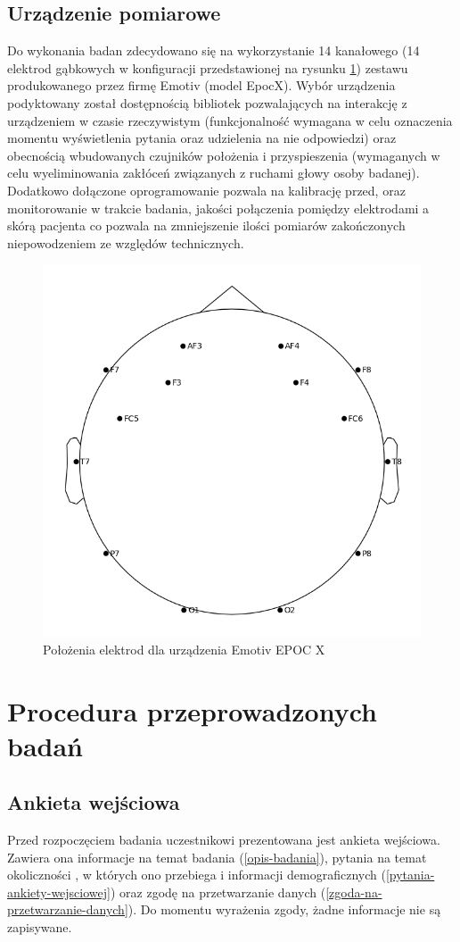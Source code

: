 \documentclass{./assets/wfis}
\begin{document}
\subsection{Urządzenie pomiarowe}\label{emotiv}
Do wykonania badan zdecydowano się na wykorzystanie 14 kanałowego (14 elektrod gąbkowych w konfiguracji przedstawionej na rysunku \ref{fig:emotiv-electrode-locations}) zestawu produkowanego przez firmę Emotiv (model EpocX\cite{emotiv_inc_epoc_nodate}). Wybór urządzenia podyktowany został dostępnością bibliotek pozwalających na interakcję z urządzeniem w czasie rzeczywistym\cite{emotiv_inc_emotiv_nodate-1} (funkcjonalność wymagana w celu oznaczenia momentu wyświetlenia pytania oraz udzielenia na nie odpowiedzi) oraz obecnością wbudowanych czujników położenia i przyspieszenia (wymaganych w celu wyeliminowania zakłóceń związanych z ruchami głowy osoby badanej). Dodatkowo dołączone oprogramowanie pozwala na kalibrację przed, oraz monitorowanie w trakcie badania, jakości połączenia pomiędzy elektrodami a skórą pacjenta co pozwala na zmniejszenie ilości pomiarów zakończonych niepowodzeniem ze względów technicznych.

\begin{figure}[h!]
    \centering
    \includegraphics[width=0.5\columnwidth]{thesis/emotiv_electrode_locations.png}
    \caption{Położenia elektrod dla urządzenia Emotiv EPOC X}
    \label{fig:emotiv-electrode-locations}
\end{figure}


\section{Procedura przeprowadzonych badań}\label{procedura-badan}
\subsection{Ankieta wejściowa}
Przed rozpoczęciem badania uczestnikowi prezentowana jest ankieta wejściowa. Zawiera ona informacje na temat badania (\autoref{opis-badania}), pytania na temat okoliczności , w których ono przebiega i informacji demograficznych (\autoref{pytania-ankiety-wejsciowej}) oraz zgodę na przetwarzanie danych (\autoref{zgoda-na-przetwarzanie-danych}). Do momentu wyrażenia zgody, żadne informacje nie są zapisywane.
\end{document}
